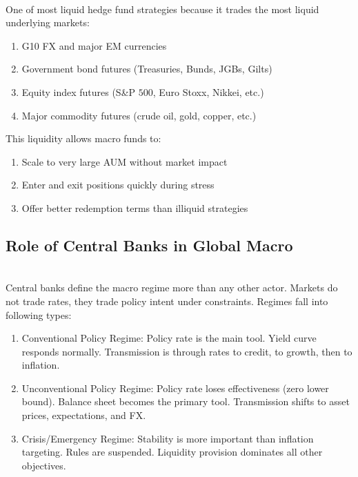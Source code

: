 \documentclass[a4paper,oneside,openany]{book}
\begin{document}
\begin{remark} \\
One of most liquid hedge fund strategies because it trades the most liquid underlying markets:
\begin{enumerate}[label=\roman*.]
\setlength{\itemsep}{0pt}
\item G10 FX and major EM currencies
\item Government bond futures (Treasuries, Bunds, JGBs, Gilts)
\item Equity index futures (S\&P $500$, Euro Stoxx, Nikkei, etc.)
\item Major commodity futures (crude oil, gold, copper, etc.)
\end{enumerate}
This liquidity allows macro funds to:
\begin{enumerate}[label=\roman*.]
\setlength{\itemsep}{0pt}
\item Scale to very large AUM without market impact
\item Enter and exit positions quickly during stress
\item Offer better redemption terms than illiquid strategies
\end{enumerate}
\end{remark}

\subsection*{Role of Central Banks in Global Macro}

\begin{remark} \\
Central banks define the macro regime more than any other actor. Markets do not trade rates, they trade policy intent under constraints. Regimes fall into following types:
\begin{enumerate}[label=\roman*.]
\setlength{\itemsep}{0pt}
\item Conventional Policy Regime: Policy rate is the main tool. Yield curve responds normally. Transmission is through rates to credit, to growth, then to inflation.
\item Unconventional Policy Regime: Policy rate loses effectiveness (zero lower bound). Balance sheet becomes the primary tool. Transmission shifts to asset prices, expectations, and FX.
\item Crisis/Emergency Regime: Stability is more important than inflation targeting. Rules are suspended. Liquidity provision dominates all other objectives.
\end{enumerate}
\end{remark}
\end{document}
